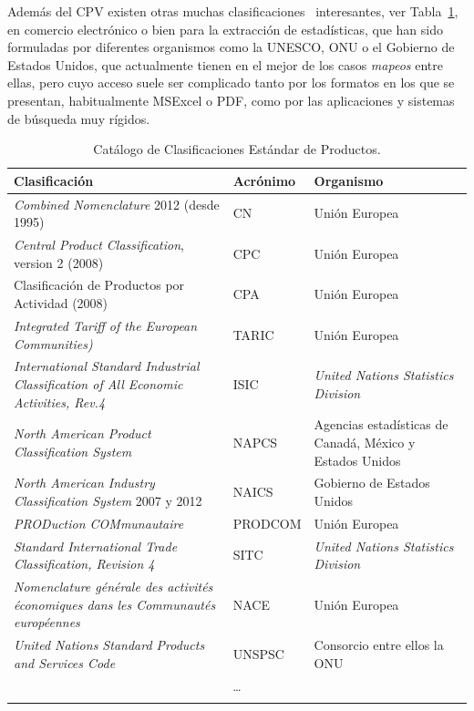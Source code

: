 Además del CPV existen otras muchas clasificaciones~\cite{Norbert-class} interesantes, ver Tabla~\ref{table:pscs}, en comercio electrónico o bien
para la extracción de estadísticas, que han sido formuladas por diferentes organismos como
la \gls{UNESCO}, \gls{ONU} o el Gobierno de Estados Unidos, que actualmente tienen en el mejor de los casos \textit{mapeos} entre ellas, 
pero cuyo acceso suele ser complicado tanto por los formatos en los que se presentan, habitualmente MSExcel o \gls{PDF}, como por 
las aplicaciones y sistemas de búsqueda muy rígidos. 

\begin{longtable}[c]{|p{6cm}|l|p{6cm}|} 
\hline
  \textbf{Clasificación} &  \textbf{Acrónimo} & \textbf{Organismo} \\\hline
\endhead
\textit{Combined Nomenclature} 2012 (desde 1995) & \gls{CN} & Unión Europea  \\ \hline
\textit{Central Product Classification}, version 2 (2008) & \gls{CPC} & Unión Europea \\ \hline
Clasificación de Productos por Actividad (2008) & \gls{CPA} & Unión Europea \\ \hline
\textit{Integrated Tariff of the European Communities)} & \gls{TARIC} & Unión Europea\\ \hline
\textit{International Standard Industrial Classification of All Economic Activities, Rev.4} & \gls{ISIC} & \textit{United Nations Statistics Division} \\ \hline
\textit{North American Product Classification System} & \gls{NAPCS} & Agencias estadísticas de Canadá, México y Estados Unidos\\ \hline
\textit{North American Industry Classification System} 2007 y 2012 & \gls{NAICS} & Gobierno de Estados Unidos \\ \hline
\textit{PRODuction COMmunautaire} & \gls{PRODCOM} & Unión Europea \\ \hline
\textit{Standard International Trade Classification, Revision 4} & \gls{SITC} & \textit{United Nations Statistics Division} \\ \hline
\textit{Nomenclature générale des activités économiques dans les Communautés européennes} & \gls{NACE} & Unión Europea \\ \hline
\textit{United Nations Standard Products and Services Code} & \gls{UNSPSC} & Consorcio entre ellos la ONU\\ \hline
  \multicolumn{3}{|c|}{\ldots}  \\ \hline
\hline
\caption{Catálogo de Clasificaciones Estándar de Productos.}\label{table:pscs}\\    
\end{longtable}

